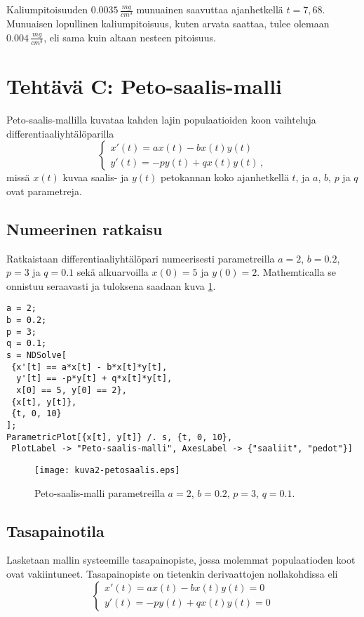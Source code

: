 \documentclass[a4paper,11pt]{article}
\begin{document}
{Kaliumpitoisuuden $0.0035\,\frac{mg}{cm^3}$ munuainen saavuttaa ajanhetkellä $t=7,68$. Munuaisen lopullinen kaliumpitoisuus, kuten arvata saattaa, tulee olemaan $0.004\,\frac{mg}{cm^3}$, eli sama kuin altaan nesteen pitoisuus.

\section{Tehtävä C: Peto-saalis-malli}

Peto-saalis-mallilla kuvataa kahden lajin populaatioiden koon vaihteluja differentiaaliyhtälöparilla
\begin{equation}
    \begin{cases}
    x'(t)=ax(t)-bx(t)y(t)\\
    y'(t)=-py(t)+qx(t)y(t)\,,
    \end{cases}
\end{equation}
missä $x(t)$ kuvaa saalis- ja $y(t)$ petokannan koko ajanhetkellä $t$, ja $a$, $b$, $p$ ja $q$ ovat parametreja.

\subsection{Numeerinen ratkaisu}

Ratkaistaan differentiaaliyhtälöpari numeerisesti parametreilla $a=2$, $b=0.2$, $p=3$ ja $q=0.1$ sekä alkuarvoilla $x(0)=5$ ja $y(0)=2$. Mathemticalla se onnistuu seraavasti ja tuloksena saadaan kuva \ref{fig:petos}.

\begin{lstlisting}
a = 2;
b = 0.2;
p = 3;
q = 0.1;
s = NDSolve[
 {x'[t] == a*x[t] - b*x[t]*y[t], 
  y'[t] == -p*y[t] + q*x[t]*y[t],
  x[0] == 5, y[0] == 2},
 {x[t], y[t]},
 {t, 0, 10}
];
ParametricPlot[{x[t], y[t]} /. s, {t, 0, 10}, 
 PlotLabel -> "Peto-saalis-malli", AxesLabel -> {"saaliit", "pedot"}]
\end{lstlisting}

\begin{figure}
    \centering
    \texttt{[image: kuva2-petosaalis.eps]}
    \caption{Peto-saalis-malli parametreilla $a=2$, $b=0.2$, $p=3$, $q=0.1$.}
    \label{fig:petos}
\end{figure}

\subsection{Tasapainotila}

Lasketaan mallin systeemille tasapainopiste, jossa molemmat populaatioden koot ovat vakiintuneet. Tasapainopiste on tietenkin derivaattojen nollakohdissa eli
\begin{equation}
    \begin{cases}
    x'(t)=ax(t)-bx(t)y(t)=0\\
    y'(t)=-py(t)+qx(t)y(t)=0
    \end{cases}
\end{equation}

}
\end{document}

